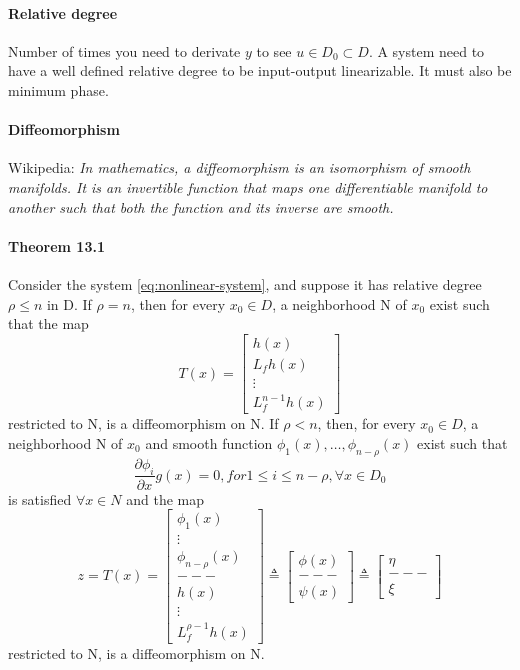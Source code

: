 \paragraph{Relative degree} Number of times you need to derivate $y$ to see $u \in D_0 \subset D$.
A system need to have a well defined relative degree to be input-output linearizable. It must also be minimum phase.

\paragraph{Diffeomorphism} Wikipedia: \emph{In mathematics, a diffeomorphism is an isomorphism of smooth manifolds. It is an invertible function that maps one differentiable manifold to another such that both the function and its inverse are smooth.}

\paragraph{Theorem 13.1} Consider the system \ref{eq:nonlinear-system}, and suppose it has relative degree $\rho \leq n$ in D. If $\rho = n$, then for every $x_0 \in D$, a neighborhood N of $x_0$ exist such that the map
\begin{equation}
T(x) = \left[
\begin{array}{ccc}
h(x)\\
L_f h(x)\\
\vdots \\
L_f^{n-1} h(x)
\end{array}
\right]
\end{equation}
restricted to N, is a diffeomorphism on N. If $\rho < n$, then, for every $x_0 \in D$, a neighborhood N of $x_0$ and smooth function $\phi_1 (x), \dots , \phi_{n-\rho} (x)$ exist such that 
\begin{equation}
\frac{\partial \phi_i}{\partial x}g(x) = 0, for 1\leq i \leq n-\rho, \forall x \in D_0
\end{equation}
is satisfied $\forall x \in N$ and the map
\begin{equation}
z=T(x) =
\left[ \begin{array}{ccc}
\phi_1(x) \\ \vdots \\ \phi_{n-\rho}(x) \\ --- \\ h(x) \\ \vdots \\ L_f^{\rho-1} h(x)
\end{array} \right]
\triangleq
\left[ \begin{array}{ccc}
\phi(x) \\ --- \\ \psi(x)
\end{array} \right]
\triangleq
\left[ \begin{array}{ccc}
\eta \\ --- \\ \xi
\end{array} \right]
\end{equation}
restricted to N, is a diffeomorphism on N.

